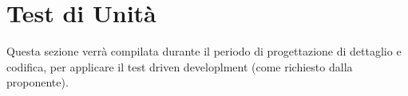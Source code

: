 \section{Test di Unità}
Questa sezione verrà compilata durante il periodo di progettazione di dettaglio e codifica, per applicare il test driven developlment (come richiesto dalla proponente).